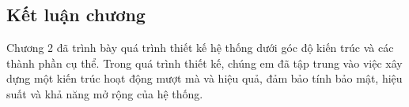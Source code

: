 \subsection{Kết luận chương}

Chương 2 đã trình bày quá trình thiết kế hệ thống 
dưới góc độ kiến trúc và các thành
 phần cụ thể. Trong quá trình thiết kế, chúng em đã tập trung
  vào việc xây dựng một kiến trúc hoạt động mượt mà và hiệu quả,
   đảm bảo tính bảo mật, hiệu suất và khả năng mở rộng của hệ
    thống.

\newpage